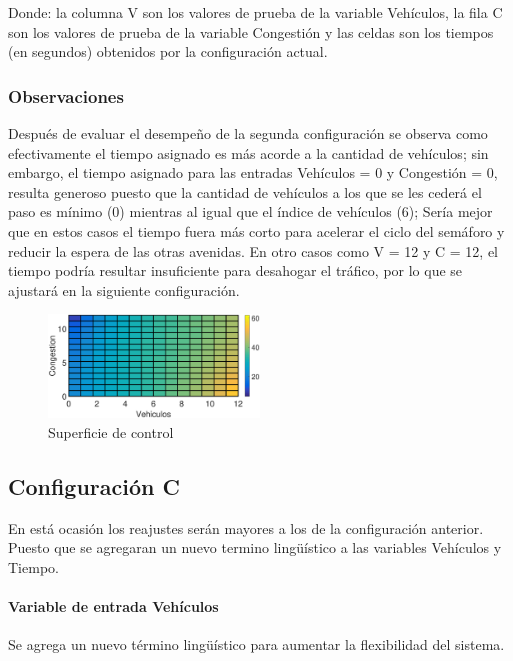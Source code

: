 Donde: la columna V son los valores de prueba de la variable Vehículos, la fila C son los valores de  prueba de la variable Congestión y las celdas son los tiempos (en segundos) obtenidos por la configuración actual.

\subsubsection{Observaciones}
\begin{multicols}{2}
Después de evaluar el desempeño de la segunda configuración se observa como efectivamente el tiempo asignado es más acorde a la cantidad de vehículos; sin embargo, el tiempo asignado para las entradas Vehículos = 0 y Congestión = 0, resulta generoso puesto que la cantidad de vehículos a los que se les cederá el paso es mínimo (0) mientras al igual que el índice de vehículos (6); Sería mejor que en estos casos el tiempo fuera más corto para acelerar el ciclo del semáforo y reducir la espera de las otras avenidas. En otro casos como V = 12 y C = 12, el tiempo podría resultar insuficiente para desahogar el tráfico, por lo que se ajustará en la siguiente configuración.

\begin{figure}[H]
	\includegraphics[width=0.5\textwidth]{Surfaces/Surface2D_B.eps}
	\caption{Superficie de control}
\end{figure}

\end{multicols}


\pagebreak
\subsection{Configuración C}
En está ocasión los reajustes serán mayores a los de la configuración anterior. Puesto que se agregaran un nuevo termino lingüístico a las variables Vehículos y Tiempo.

\paragraph{Variable de entrada Vehículos} Se agrega un nuevo término lingüístico para aumentar la flexibilidad del sistema.


